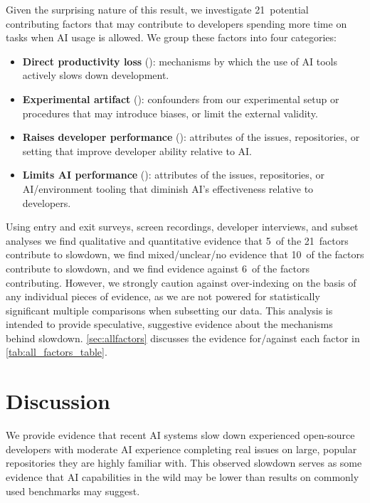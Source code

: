 \documentclass{article}
\newcommand{\DirectLossIcon}{\textcolor{lossred}{\faHourglassHalf}}
\newcommand{\ExperimentalArtifactIcon}{\textcolor{expgreen}{\faFlask}}
\newcommand{\RaisesHumanIcon}{\textcolor{humanblue}{\faUser}}
\newcommand{\LimitsAIIcon}{\textcolor{aigray}{\faRobot}}
\newcommand{\NumFactorsTotal}{21}
\newcommand{\NumFactorsThatLikelyContribute}{5}
\newcommand{\NumFactorsThatAreUnclear}{10}
\newcommand{\NumFactorsThatDoNotContribute}{6}
\begin{document}
Given the surprising nature of this result, we investigate \NumFactorsTotal\ potential contributing factors that may contribute to developers spending more time on tasks when AI usage is allowed. We group these factors into four categories:
\begin{itemize}
    \item \textbf{Direct productivity loss} (\DirectLossIcon): mechanisms by which the use of AI tools actively slows down development.
    \item \textbf{Experimental artifact} (\ExperimentalArtifactIcon): confounders from our experimental setup or procedures that may introduce biases, or limit the external validity.
    \item \textbf{Raises developer performance} (\RaisesHumanIcon): attributes of the issues, repositories, or setting that improve developer ability relative to AI.
    \item \textbf{Limits AI performance} (\LimitsAIIcon): attributes of the issues, repositories, or AI/environment tooling that diminish AI's effectiveness relative to developers.
\end{itemize}

Using entry and exit surveys, screen recordings, developer interviews, and subset analyses we find qualitative and quantitative evidence that \NumFactorsThatLikelyContribute\
of the \NumFactorsTotal\ factors contribute to slowdown, we find mixed/unclear/no evidence that \NumFactorsThatAreUnclear\ of the factors contribute to slowdown, and we find evidence against \NumFactorsThatDoNotContribute\ of the factors contributing. However, we strongly caution against over-indexing on the basis of any individual pieces of evidence, as we are not powered for statistically significant multiple comparisons when subsetting our data. This analysis is intended to provide speculative, suggestive evidence about the mechanisms behind slowdown. \autoref{sec:allfactors} discusses the evidence for/against each factor in \autoref{tab:all_factors_table}.



\section{Discussion}
\label{sec:Discussion}

We provide evidence that recent AI systems slow down experienced open-source developers with moderate AI experience completing real issues on large, popular repositories they are highly familiar with. 
This observed slowdown serves as some evidence that AI capabilities in the wild may be lower than results on commonly used benchmarks may suggest.
\end{document}
